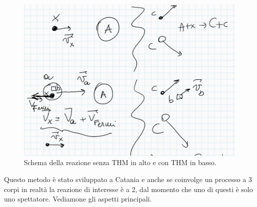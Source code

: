 \begin{figure}[ht]
	\centering
	\includegraphics[scale=0.5]{Immagini/0419_scontro.png}
	\caption{Schema della reazione senza THM in alto e con THM in basso.}
	\label{0419_scontro}
\end{figure}

\noindent Questo metodo è stato sviluppato a Catania e anche se coinvolge un processo a 3 corpi in realtà la reazione di interesse è a 2, dal momento che uno di questi è solo uno spettatore. Vediamone gli aspetti principali.

